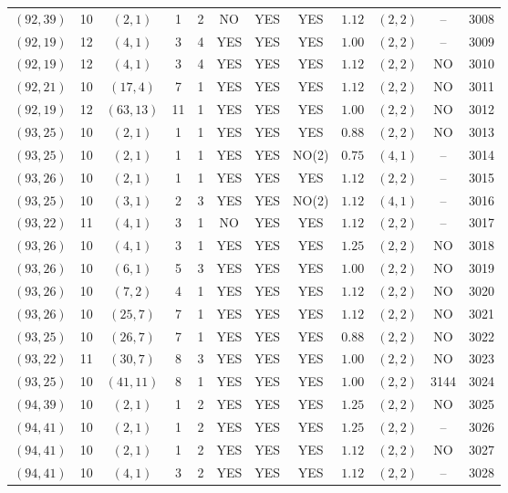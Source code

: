 \begin{longtable}{|c|c|c|c|c|c|c|c|c|c|c|c|}
$(92,39)$ & 10 & $(2,1)$ & 1 & 2 & NO & YES & YES & $1.12$ & $(2,2)$ & -- & 3008\\
$(92,19)$ & 12 & $(4,1)$ & 3 & 4 & YES & YES & YES & $1.00$ & $(2,2)$ & -- & 3009\\
$(92,19)$ & 12 & $(4,1)$ & 3 & 4 & YES & YES & YES & $1.12$ & $(2,2)$ & NO & 3010\\
$(92,21)$ & 10 & $(17,4)$ & 7 & 1 & YES & YES & YES & $1.12$ & $(2,2)$ & NO & 3011\\
$(92,19)$ & 12 & $(63,13)$ & 11 & 1 & YES & YES & YES & $1.00$ & $(2,2)$ & NO & 3012\\
$(93,25)$ & 10 & $(2,1)$ & 1 & 1 & YES & YES & YES & $0.88$ & $(2,2)$ & NO & 3013\\
$(93,25)$ & 10 & $(2,1)$ & 1 & 1 & YES & YES & NO(2) & $0.75$ & $(4,1)$ & -- & 3014\\
$(93,26)$ & 10 & $(2,1)$ & 1 & 1 & YES & YES & YES & $1.12$ & $(2,2)$ & -- & 3015\\
$(93,25)$ & 10 & $(3,1)$ & 2 & 3 & YES & YES & NO(2) & $1.12$ & $(4,1)$ & -- & 3016\\
$(93,22)$ & 11 & $(4,1)$ & 3 & 1 & NO & YES & YES & $1.12$ & $(2,2)$ & -- & 3017\\
$(93,26)$ & 10 & $(4,1)$ & 3 & 1 & YES & YES & YES & $1.25$ & $(2,2)$ & NO & 3018\\
$(93,26)$ & 10 & $(6,1)$ & 5 & 3 & YES & YES & YES & $1.00$ & $(2,2)$ & NO & 3019\\
$(93,26)$ & 10 & $(7,2)$ & 4 & 1 & YES & YES & YES & $1.12$ & $(2,2)$ & NO & 3020\\
$(93,26)$ & 10 & $(25,7)$ & 7 & 1 & YES & YES & YES & $1.12$ & $(2,2)$ & NO & 3021\\
$(93,25)$ & 10 & $(26,7)$ & 7 & 1 & YES & YES & YES & $0.88$ & $(2,2)$ & NO & 3022\\
$(93,22)$ & 11 & $(30,7)$ & 8 & 3 & YES & YES & YES & $1.00$ & $(2,2)$ & NO & 3023\\
$(93,25)$ & 10 & $(41,11)$ & 8 & 1 & YES & YES & YES & $1.00$ & $(2,2)$ & 3144 & 3024\\
$(94,39)$ & 10 & $(2,1)$ & 1 & 2 & YES & YES & YES & $1.25$ & $(2,2)$ & NO & 3025\\
$(94,41)$ & 10 & $(2,1)$ & 1 & 2 & YES & YES & YES & $1.25$ & $(2,2)$ & -- & 3026\\
$(94,41)$ & 10 & $(2,1)$ & 1 & 2 & YES & YES & YES & $1.12$ & $(2,2)$ & NO & 3027\\
$(94,41)$ & 10 & $(4,1)$ & 3 & 2 & YES & YES & YES & $1.12$ & $(2,2)$ & -- & 3028\\

\end{longtable}
